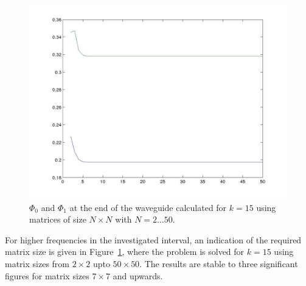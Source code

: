 \documentclass[numreferences]{kluwer}
\renewcommand{\Phi}{\varPhi}
\renewcommand{\Re}{\operatorname{Re}}
\renewcommand{\Phi}{\varPhi}
\begin{document}
\begin{figure}[htb]
  \centering
  \includegraphics[scale=0.45]{T_N}
  \caption{$\Phi_0$ and $\Phi_1$ at the end of the waveguide
    calculated for $k=15$ using matrices of size $N\times N$ with
    $N=2\dots50$.}
  \label{fig:T_N}
\end{figure}

For higher frequencies in the investigated interval, an indication of
the required matrix size is given in Figure~\ref{fig:T_N}, where the
problem is solved for $k=15$ using matrix sizes from $2\times2$ upto
$50\times50$. The results are stable to three significant figures for
matrix sizes $7\times7$ and upwards.






\end{document}

